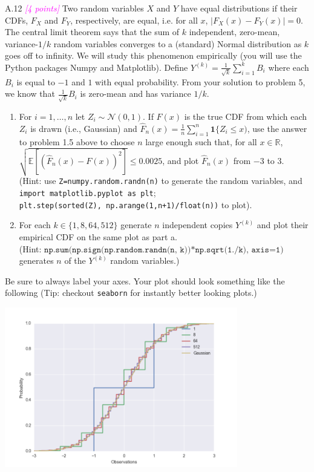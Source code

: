 \documentclass{article}
\newcommand{\field}[1]{\mathbb{#1}}
\newcommand{\1}{\mathbf{1}}
\newcommand{\E}{\mathbb{E}}
\newcommand{\R}{\field{R}} %
\newcommand{\points}[1]{\small\textcolor{magenta}{\emph{[#1 points]}} \normalsize}
\begin{document}
A.12 \points{4} Two random variables $X$ and $Y$ have equal
  distributions if their CDFs, $F_X$ and $F_Y$, respectively, are
  equal, i.e. for all $x$, $ |F_X(x) - F_Y(x)| = 0$. 
The central limit theorem says that the sum of $k$ independent,
zero-mean, variance-$1/k$ random variables converges to a (standard) Normal distribution as $k$ goes off to infinity.  
We will study this phenomenon empirically (you will use the Python packages Numpy and Matplotlib). 
Define $Y^{(k)} = \frac{1}{\sqrt{k}} \sum_{i=1}^k B_i$ where each $B_i$ is equal to $-1$ and $1$ with equal probability.
From your solution to problem 5, we know that $\frac{1}{\sqrt{k}} B_i$ is zero-mean and has variance $1/k$.
\begin{enumerate}
\item For $i=1,\dots,n$ let $Z_i \sim \mathcal{N}(0,1)$. If
  $F(x)$ is the true CDF from which each $Z_i$ is drawn (i.e.,
  Gaussian) and $\widehat{F}_n(x) = \frac{1}{n} \sum_{i=1}^n
  \1\{ Z_i \leq x)$, use the answer to problem 1.5  above to choose
  $n$ large enough such that, for all $x \in \R$, $ \sqrt{\E[
    (\widehat{F}_n(x)-F(x))^2 ]} \leq 0.0025$, and plot
  $\widehat{F}_n(x)$ from $-3$ to $3$. \\(Hint: use
  \texttt{Z=numpy.random.randn(n)} to generate the random
  variables, and \texttt{import matplotlib.pyplot as plt};\\
  \texttt{plt.step(sorted(Z), np.arange(1,n+1)/float(n))} to
  plot). 
\item For each $k \in \{1, 8, 64, 512\}$ generate $n$
  independent copies $Y^{(k)}$ and plot their empirical CDF on
  the same plot as part a.\\ (Hint: 
  $\texttt{np.sum(np.sign(np.random.randn(n,
    k))*np.sqrt(1./k), axis=1)}$ generates $n$ of the
  $Y^{(k)}$ random variables.) 
\end{enumerate}
Be sure to always label your axes. 
Your plot should look something like the following (Tip: checkout \texttt{seaborn} for instantly better looking plots.)

\begin{center}
\includegraphics[width=4in]{full.png}
\end{center} 
\end{document}
